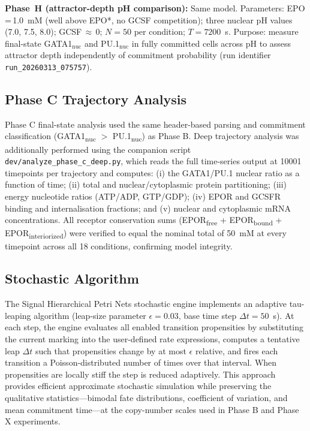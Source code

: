 \textbf{Phase~H (attractor-depth pH comparison):} Same model. Parameters: EPO\,=\,1.0~mM (well above EPO*, no GCSF competition); three nuclear pH values (7.0, 7.5, 8.0); GCSF\,$\approx$\,0; $N=50$ per condition; $T=7200$~s. Purpose: measure final-state GATA1$_\text{nuc}$ and PU.1$_\text{nuc}$ in fully committed cells across pH to assess attractor depth independently of commitment probability (run identifier \texttt{run\_20260313\_075757}).

\subsection{Phase C Trajectory Analysis}

Phase C final-state analysis used the same header-based parsing and commitment classification (GATA1\textsubscript{nuc} $>$ PU.1\textsubscript{nuc}) as Phase B. Deep trajectory analysis was additionally performed using the companion script \texttt{dev/analyze\_phase\_c\_deep.py}, which reads the full time-series output at 10001 timepoints per trajectory and computes: (i) the GATA1/PU.1 nuclear ratio as a function of time; (ii) total and nuclear/cytoplasmic protein partitioning; (iii) energy nucleotide ratios (ATP/ADP, GTP/GDP); (iv) EPOR and GCSFR binding and internalisation fractions; and (v) nuclear and cytoplasmic mRNA concentrations. All receptor conservation sums (EPOR\textsubscript{free} + EPOR\textsubscript{bound} + EPOR\textsubscript{interiorized}) were verified to equal the nominal total of 50~mM at every timepoint across all 18 conditions, confirming model integrity.

\subsection{Stochastic Algorithm}

The Signal Hierarchical Petri Nets stochastic engine implements an adaptive tau-leaping algorithm (leap-size parameter $\epsilon = 0.03$, base time step $\Delta t = 50$~s). At each step, the engine evaluates all enabled transition propensities by substituting the current marking into the user-defined rate expressions, computes a tentative leap $\Delta t$ such that propensities change by at most $\epsilon$ relative, and fires each transition a Poisson-distributed number of times over that interval. When propensities are locally stiff the step is reduced adaptively. This approach provides efficient approximate stochastic simulation while preserving the qualitative statistics---bimodal fate distributions, coefficient of variation, and mean commitment time---at the copy-number scales used in Phase B and Phase X experiments.

